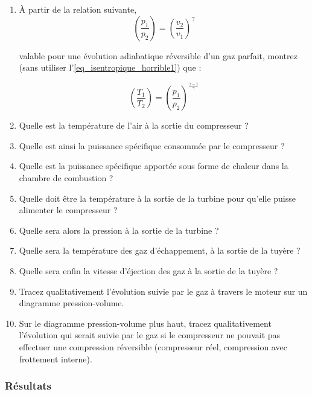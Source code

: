 	\begin{enumerate}
		\item À partir de la relation suivante,
			\begin{equation*}
				\left( \frac{p_1}{p_2} \right)	= \left( \frac{v_2}{v_1} \right)^{\gamma}
			\end{equation*}
							
			valable pour une évolution adiabatique réversible d’un gaz parfait, montrez (sans utiliser l’\cref{eq_isentropique_horrible1}) que :
			
			\begin{equation*}
				\left( \frac{T_1}{T_2} \right)	=  \left( \frac{p_1}{p_2} \right)^{\frac{\gamma -1}{\gamma}}
			\end{equation*}
			
		\item Quelle est la température de l’air à la sortie du compresseur ?
		\item Quelle est ainsi la puissance spécifique consommée par le compresseur ?
		\item Quelle est la puissance spécifique apportée sous forme de chaleur dans la chambre de combustion ?
		\item Quelle doit être la température à la sortie de la turbine pour qu’elle puisse alimenter le compresseur ?
		\item Quelle sera alors la pression à la sortie de la turbine ?
		\item Quelle sera la température des gaz d’échappement, à la sortie de la tuyère ?
		\item Quelle sera enfin la vitesse d’éjection des gaz à la sortie de la tuyère ?
		\item Tracez qualitativement l’évolution suivie par le gaz à travers le moteur sur un diagramme pression-volume.
		\item Sur le diagramme pression-volume plus haut, tracez qualitativement l’évolution qui serait suivie par le gaz si le compresseur ne pouvait pas effectuer une compression réversible (compresseur réel, compression avec frottement interne).
	\end{enumerate}


\exercisesolutionpage
\subsubsection*{Résultats}
	\linktosolutionsblurb

